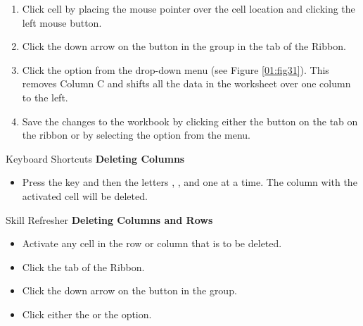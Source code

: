 \begin{enumerate}[resume]
	\item Click cell  by placing the mouse pointer over the cell location and clicking the left mouse button.
	\item Click the down arrow on the  button in the  group in the  tab of the Ribbon.
	\item Click the  option from the drop-down menu (see Figure \ref{01:fig31}). This removes Column C and shifts all the data in the worksheet over one column to the left.
	\item Save the changes to the workbook by clicking either the  button on the  tab on the ribbon or by selecting the  option from the  menu.
\end{enumerate}

\begin{center}
	\begin{shtcutbox}{Keyboard Shortcuts}
		\textbf{Deleting Columns}
		\\
		\begin{itemize}
			\setlength{\itemsep}{0pt}
			\setlength{\parskip}{0pt}
			\setlength{\parsep}{0pt}
			
			\item Press the  key and then the letters , , and  one at a time. The column with the activated cell will be deleted.
			
		\end{itemize}
	\end{shtcutbox}
\end{center}

\begin{center}
	\begin{sklbox}{Skill Refresher}
		\textbf{Deleting Columns and Rows}
		\\
		\begin{itemize}
			\setlength{\itemsep}{0pt}
			\setlength{\parskip}{0pt}
			\setlength{\parsep}{0pt}
			
			\item Activate any cell in the row or column that is to be deleted.
			\item Click the  tab of the Ribbon.
			\item Click the down arrow on the  button in the  group.
			\item Click either the  or the  option.
			
		\end{itemize}
	\end{sklbox}
\end{center}

